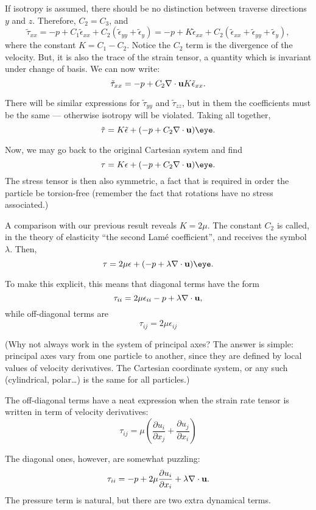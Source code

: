 If isotropy is assumed, there should be no distinction between
traverse directions $y$ and $z$. Therefore, $C_2=C_3$, and
\[
\tilde{\tau}_{xx}=
- p + 
C_1 \tilde{\epsilon}_{xx} +
C_2 ( \tilde{\epsilon}_{yy} +  \tilde{\epsilon}_{y}  ) =
- p + 
K \tilde{\epsilon}_{xx} +
C_2 ( \tilde{\epsilon}_{xx} + \tilde{\epsilon}_{yy} +  \tilde{\epsilon}_{y}  ) ,
\]
where the constant $K=C_1-C_2$. Notice the $C_2$ term is the
divergence of the velocity. But, it is also the trace of the strain
tensor, a quantity which is invariant under change of basis. We can
now write:
\[
\tilde{\tau}_{xx}=
- p + C_2 \nabla\cdot \mathbf{u} 
K \tilde{\epsilon}_{xx} .
\]

There will be similar expressions for $\tilde{\tau}_{yy}$ and
$\tilde{\tau}_{zz}$, but in them the coefficients must be the same ---
otherwise isotropy will be violated. Taking all together,
\[
\tilde{\tau}=
K \tilde{\epsilon}
+ ( - p + C_2 \nabla\cdot \bfu ) \eye.
\]

Now, we may go back to the original Cartesian system and find
\[
\tau=
K \epsilon
+ ( - p + C_2 \nabla\cdot \bfu ) \eye.
\]
The stress tensor is then also symmetric, a fact that is required in
order the particle be torsion-free (remember the fact that rotations
have no stress associated.)

A comparison with our previous result reveals $K=2\mu$. The constant
$C_2$ is called, in the theory of elasticity ``the second Lam\'e
coefficient'', and receives the symbol $\lambda$. Then,
\[
\tau=
2 \mu \epsilon + ( - p + \lambda \nabla\cdot \bfu ) \eye.
\]

To make this explicit, this means that diagonal terms have the form
\[
\tau_{ii}=
2 \mu \epsilon_{ii}  - p + \lambda \nabla\cdot \mathbf{u} ,
\]
while off-diagonal terms are
\[
\tau_{ij}=
2 \mu \epsilon_{ij}
\]

(Why not always work in the system of principal axes? The answer is
simple: principal axes vary from one particle to another, since they
are defined by local values of velocity derivatives. The Cartesian
coordinate system, or any such (cylindrical, polar\ldots) is the same
for all particles.)

The off-diagonal terms have a neat expression when the strain rate
tensor is written in term of velocity derivatives:
\[
\tau_{ij}=
\mu
\left(
\frac{\partial u_i}{\partial x_j} +
\frac{\partial u_j}{\partial x_i}
\right)
\]

The diagonal ones, however, are somewhat puzzling:
\[
\tau_{ii}=
- p +
2 \mu \frac{\partial u_i}{\partial x_i}  + \lambda \nabla\cdot \mathbf{u} .
\]
The pressure term is natural, but there are two extra dynamical terms.

